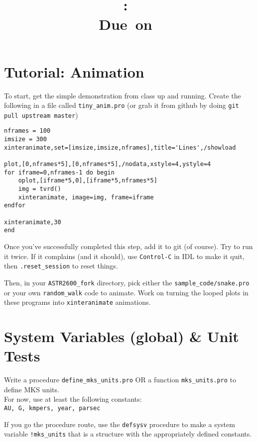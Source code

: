 \documentclass{article}
\title{\vspace{2in}\textmd{\textbf{\hmwkClass:\ \hmwkTitle}}\\\normalsize\vspace{0.1in}\small{Due\ on\ \hmwkDueDate}\\\vspace{0.1in}\large{}\vspace{3in}}
\date{}
\begin{document}
\begin{spacing}{1.0}
\newpage



\section{Tutorial: Animation}

To start, get the simple demonstration from class up and running.
Create the following in a file called \verb|tiny_anim.pro| (or grab it from 
github by doing \verb|git pull upstream master|)\\
\begin{lstlisting}
nframes = 100
imsize = 300
xinteranimate,set=[imsize,imsize,nframes],title='Lines',/showload

plot,[0,nframes*5],[0,nframes*5],/nodata,xstyle=4,ystyle=4
for iframe=0,nframes-1 do begin
    oplot,[iframe*5,0],[iframe*5,nframes*5]
    img = tvrd()
    xinteranimate, image=img, frame=iframe
endfor

xinteranimate,30
end
\end{lstlisting}

Once you've successfully completed this step, add it to git (of course).  Try
to run it twice.  If it complains (and it should), use \verb|Control-C| in IDL
to make it quit, then \verb|.reset_session| to reset things.

Then, in your \verb|ASTR2600_fork| directory, pick either the
\verb|sample_code/snake.pro| or your own \verb|random_walk| code to animate.
Work on turning the looped plots in these programs into \verb|xinteranimate|
animations.

\section{System Variables (global) \& Unit Tests}
Write a procedure  \verb|define_mks_units.pro| OR a function
\verb|mks_units.pro| to define MKS units.\\
For now, use at least the following constants:\\
\verb|AU, G, kmpers, year, parsec|

If you go the procedure route, use the \verb|defsysv| procedure to make a
system variable \verb|!mks_units| that is a structure with the appropriately
defined constants.


\end{spacing}
\end{document}
